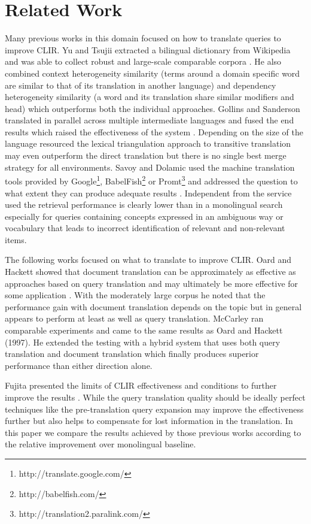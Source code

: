 \documentclass[journal]{IEEEtran}
\begin{document}
\section{Related Work}
Many previous works in this domain focused on how to translate queries to improve CLIR.
Yu and Tsujii extracted a bilingual dictionary from Wikipedia and was able to collect robust and large-scale comparable corpora \cite{yu09}.
He also combined context heterogeneity similarity (terms around a domain specific word are similar to that of its translation in another language) and dependency heterogeneity similarity (a word and its translation share similar modifiers and head) which outperforms both the individual approaches.
Gollins and Sanderson translated in parallel across multiple intermediate languages and fused the end results which raised the effectiveness of the system \cite{gollins01}.
Depending on the size of the language resourced the lexical triangulation approach to transitive translation may even outperform the direct translation but there is no single best merge strategy for all environments.
Savoy and Dolamic used the machine translation tools provided by Google\footnote{http://translate.google.com/}, BabelFish\footnote{http://babelfish.com/} or Promt\footnote{http://translation2.paralink.com/} and addressed the question to what extent they can produce adequate results \cite{savoy09}.
Independent from the service used the retrieval performance is clearly lower than in a monolingual search especially for queries containing concepts expressed in an ambiguous way or vocabulary that leads to incorrect identification of relevant and non-relevant items.

The following works focused on what to translate to improve CLIR.
Oard and Hackett showed that document translation can be approximately as effective as approaches based on query translation and may ultimately be more effective for some application \cite{oard97b}.
With the moderately large corpus he noted that the performance gain with document translation depends on the topic but in general appears to perform at least as well as query translation.
McCarley \cite{mccarley99} ran comparable experiments and came to the same results as Oard and Hackett (1997).
He extended the testing with a hybrid system that uses both query translation and document translation which finally produces superior performance than either direction alone.

Fujita presented the limits of CLIR effectiveness and conditions to further improve the results \cite{fujita01}.
While the query translation quality should be ideally perfect techniques like the pre-translation query expansion may improve the effectiveness further but also helps to compensate for lost information in the translation.
In this paper we compare the results achieved by those previous works according to the relative improvement over monolingual baseline.
\end{document}
